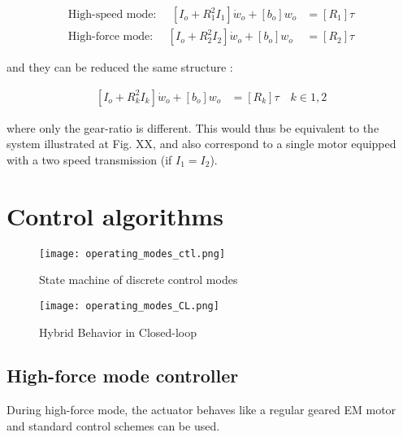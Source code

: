 \begin{align}
\text{High-speed mode: } \quad \left[ I_o + R_1^2 I_1 \right] \dot{w}_o +  \left[ b_o \right] w_o  &= \left[ R_1 \right] \tau 
\label{eq:dsdm_output_R1} \\
\text{High-force mode: } \quad \left[ I_o + R_2^2 I_2 \right] \dot{w}_o +  \left[ b_o \right] w_o  &= \left[ R_2 \right] \tau 
\label{eq:dsdm_output_R2}
\end{align}

and they can be reduced the same structure :

\begin{align}
\left[ I_o + R_k^2 I_k \right] \dot{w}_o +  \left[ b_o \right] w_o  &= \left[ R_k \right] \tau \quad k \in {1,2}
\label{eq:dsdm_output_R} 
\end{align}

where only the gear-ratio is different. This would thus be equivalent to the system illustrated at Fig. XX, and also correspond to a single motor equipped with a two speed transmission (if  $I_1 = I_2$).



\newpage

\section{Control algorithms}

\begin{figure}[H]
	\centering
		\texttt{[image: operating\_modes\_ctl.png]}
	\caption{State machine of discrete control modes}
	\label{fig:automaticflow}
\end{figure}

\begin{figure}[H]
	\centering
		\texttt{[image: operating\_modes\_CL.png]}
	\caption{Hybrid Behavior in Closed-loop}
	\label{fig:hybrid_closedloop}
\end{figure}

\subsection{High-force mode controller}

During high-force mode, the actuator behaves like a regular geared EM motor and standard control schemes can be used. %


